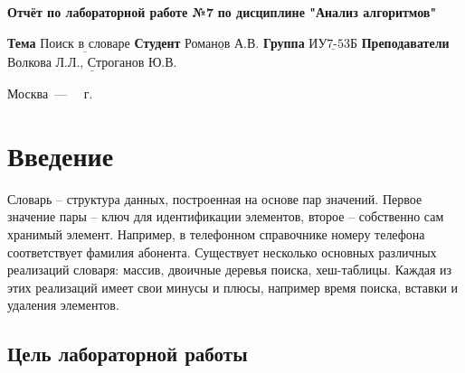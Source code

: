 \documentclass[12pt]{report}
\begin{document}
\begin{titlepage}
		
		\begin{center}
			\noindent\begin{minipage}{1.3\textwidth}\centering
				\Large\textbf{  Отчёт по лабораторной работе №7}\newline
				\textbf{по дисциплине "Анализ алгоритмов"}\newline\newline
			\end{minipage}
		\end{center}
		
		\noindent\textbf{Тема} $\underline{\text{Поиск в словаре}}$\newline\newline
		\noindent\textbf{Студент} $\underline{\text{Романов А.В.}}$\newline\newline
		\noindent\textbf{Группа} $\underline{\text{ИУ7-53Б}}$\newline\newline
		\noindent\textbf{Преподаватели} $\underline{\text{Волкова Л.Л., Строганов Ю.В.}}$\newline\newline\newline
		
		\begin{center}
			\vfill
			Москва~---~\the\year
			~г.
		\end{center}
	\end{titlepage}
	
	
	\tableofcontents
	
\newpage
\chapter*{Введение}
	
Словарь  -- структура данных, построенная  на  основе  пар  значений.  Первое  значение  пары -- ключ  для идентификации элементов, второе  -- собственно сам хранимый элемент. Например, в телефонном справочнике номеру  телефона  соответствует  фамилия  абонента. Существует несколько основных различных реализаций словаря: массив, двоичные деревья поиска, хеш-таблицы. Каждая из этих реализаций имеет свои минусы и плюсы, например время поиска, вставки и удаления элементов.
	
\section*{Цель лабораторной работы}
	
\end{document}
